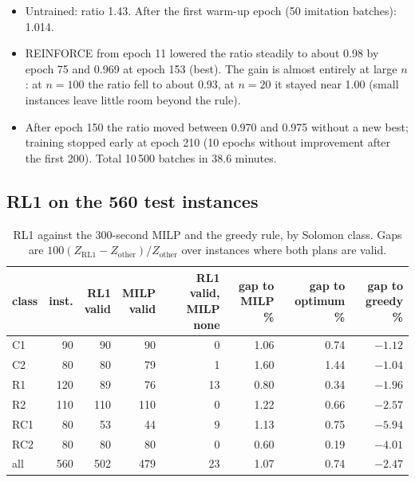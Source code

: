 \begin{itemize}
  \item Untrained: ratio 1.43. After the first warm-up epoch (50 imitation batches): 1.014.
  \item REINFORCE from epoch 11 lowered the ratio steadily to about 0.98 by epoch 75 and 0.969 at epoch 153 (best). The gain is almost entirely at large $n$: at $n=100$ the ratio fell to about 0.93, at $n=20$ it stayed near 1.00 (small instances leave little room beyond the rule).
  \item After epoch 150 the ratio moved between 0.970 and 0.975 without a new best; training stopped early at epoch 210 (10 epochs without improvement after the first 200). Total 10\,500 batches in 38.6 minutes.
\end{itemize}

\subsection{RL1 on the 560 test instances}

\begin{table}[h]
\centering\small
\caption{RL1 against the 300-second MILP and the greedy rule, by Solomon class. Gaps are $100(Z_{\text{RL1}}-Z_{\text{other}})/Z_{\text{other}}$ over instances where both plans are valid.}
\label{tab:rl1class}
\begin{tabular}{@{}lrrrrrrr@{}}
\toprule
class & inst. & \shortstack[r]{RL1\\valid} & \shortstack[r]{MILP\\valid} & \shortstack[r]{RL1 valid,\\MILP none} & \shortstack[r]{gap to\\MILP \%} & \shortstack[r]{gap to\\optimum \%} & \shortstack[r]{gap to\\greedy \%} \\
\midrule
C1 & 90 & 90 & 90 & 0 & 1.06 & 0.74 & $-1.12$ \\
C2 & 80 & 80 & 79 & 1 & 1.60 & 1.44 & $-1.04$ \\
R1 & 120 & 89 & 76 & 13 & 0.80 & 0.34 & $-1.96$ \\
R2 & 110 & 110 & 110 & 0 & 1.22 & 0.66 & $-2.57$ \\
RC1 & 80 & 53 & 44 & 9 & 1.13 & 0.75 & $-5.94$ \\
RC2 & 80 & 80 & 80 & 0 & 0.60 & 0.19 & $-4.01$ \\
\midrule
all & 560 & 502 & 479 & 23 & 1.07 & 0.74 & $-2.47$ \\
\bottomrule
\end{tabular}
\end{table}

